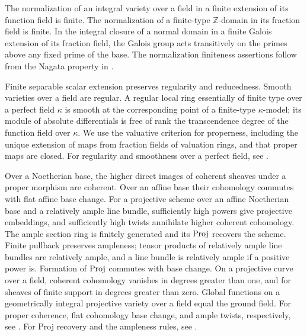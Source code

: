 \begin{foundation}[Normalization]\label{foundation:normalization}
The normalization of an integral variety over a field in a finite extension of its function field is finite. The normalization of a finite-type $\mathbb Z$-domain in its fraction field is finite. In the integral closure of a normal domain in a finite Galois extension of its fraction field, the Galois group acts transitively on the primes above any fixed prime of the base.
The normalization finiteness assertions follow from the Nagata property in \cite[Tag 0335]{Stacks}.
\end{foundation}

\begin{foundation}\label{foundation:regularity}
Finite separable scalar extension preserves regularity and reducedness. Smooth varieties over a field are regular. A regular local ring essentially of finite type over a perfect field $\kappa$ is smooth at the corresponding point of a finite-type $\kappa$-model; its module of absolute differentials is free of rank the transcendence degree of the function field over $\kappa$. We use the valuative criterion for properness, including the unique extension of maps from fraction fields of valuation rings, and that proper maps are closed.
For regularity and smoothness over a perfect field, see \cite[Tags 00TV and 0B8X]{Stacks}.
\end{foundation}

\begin{foundation}\label{foundation:cohomology}
Over a Noetherian base, the higher direct images of coherent sheaves under a proper morphism are coherent. Over an affine base their cohomology commutes with flat affine base change. For a projective scheme over an affine Noetherian base and a relatively ample line bundle, sufficiently high powers give projective embeddings, and sufficiently high twists annihilate higher coherent cohomology. The ample section ring is finitely generated and its $\operatorname{Proj}$ recovers the scheme. Finite pullback preserves ampleness; tensor products of relatively ample line bundles are relatively ample, and a line bundle is relatively ample if a positive power is. Formation of $\operatorname{Proj}$ commutes with base change. On a projective curve over a field, coherent cohomology vanishes in degrees greater than one, and for sheaves of finite support in degrees greater than zero. Global functions on a geometrically integral projective variety over a field equal the ground field.
For proper coherence, flat cohomology base change, and ample twists, respectively, see \cite[Tags 02O5, 02KH and 0B5T]{Stacks}.
For Proj recovery and the ampleness rules, see
\cite[Tags 0EKI, 0892, 0890 and 02NN]{Stacks}.
\end{foundation}

